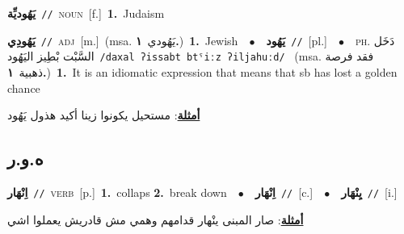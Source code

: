 \documentclass[10pt,a4paper,twoside]{article} %
\begin{document}
\begin{multicols}{2}
{\setlength\topsep{0pt}\textbf{\foreignlanguage{arabic}{يَهُوديِّة}}\ {\color{gray}\texttt{//}\color{black}}\ \textsc{noun}\ [f.]\ \textbf{1.}~Judaism\ } \vspace{2mm}

{\setlength\topsep{0pt}\textbf{\foreignlanguage{arabic}{يَهُودِي}}\ {\color{gray}\texttt{//}\color{black}}\ \textsc{adj}\ [m.]\ \color{gray}(msa. \foreignlanguage{arabic}{يَهُودي}~\foreignlanguage{arabic}{\textbf{١.}})\color{black}\ \textbf{1.}~Jewish\ \ $\bullet$\ \ \setlength\topsep{0pt}\textbf{\foreignlanguage{arabic}{يَهُود}}\ {\color{gray}\texttt{//}\color{black}}\ [pl.]\ \ $\bullet$\ \ \textsc{ph.} \color{gray} \foreignlanguage{arabic}{دَخَل السَّبْت بْطِيز اليَهُود}\color{black}\ {\color{gray}\texttt{/{\sffamily daxal ʔissabt btˤiːz ʔiljahuːd}/}\color{black}}\ \color{gray} (msa. \foreignlanguage{arabic}{فقد فرصة ذهبية}~\foreignlanguage{arabic}{\textbf{١.}})\color{black}\ \textbf{1.}~It is an idiomatic expression that means that sb has lost a golden chance\  \begin{flushright}\color{gray}\foreignlanguage{arabic}{\textbf{\underline{\foreignlanguage{arabic}{أمثلة}}}: مستحيل يكونوا زينا أكيد هذول يَهُود}\end{flushright}\color{black}} \vspace{2mm}

\vspace{-3mm}
\subsection*{\color{blue}\foreignlanguage{arabic}{ه.و.ر}\color{blue}{}} 

{\setlength\topsep{0pt}\textbf{\foreignlanguage{arabic}{اِنْهَار}}\ {\color{gray}\texttt{//}\color{black}}\ \textsc{verb}\ [p.]\ \textbf{1.}~collaps  \textbf{2.}~break down\ \ $\bullet$\ \ \setlength\topsep{0pt}\textbf{\foreignlanguage{arabic}{اِنْهَار}}\ {\color{gray}\texttt{//}\color{black}}\ [c.]\ \ $\bullet$\ \ \setlength\topsep{0pt}\textbf{\foreignlanguage{arabic}{يِنْهَار}}\ {\color{gray}\texttt{//}\color{black}}\ [i.]\  \begin{flushright}\color{gray}\foreignlanguage{arabic}{\textbf{\underline{\foreignlanguage{arabic}{أمثلة}}}: صار المبنى ينْهار قدامهم وهمي مش قادريش يعملوا اشي}\end{flushright}\color{black}} \vspace{2mm}


\end{multicols}
\end{document}
